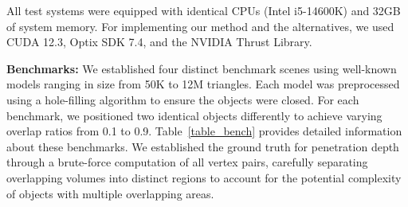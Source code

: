 All test systems were equipped with identical CPUs (Intel i5-14600K) and 32GB of system memory.
For implementing our method and the alternatives, we used CUDA 12.3, Optix SDK 7.4, and the NVIDIA Thrust Library.

\textbf{Benchmarks: }
We established four distinct benchmark scenes using well-known models ranging in size from 50K to 12M triangles.
Each model was preprocessed using a hole-filling algorithm to ensure the objects were closed.
For each benchmark, we positioned two identical objects differently to achieve varying overlap ratios from 0.1 to 0.9.
Table~\ref{table_bench} provides detailed information about these benchmarks.
We established the ground truth for penetration depth through a brute-force computation of all vertex pairs, carefully separating overlapping volumes into distinct regions to account for the potential complexity of objects with multiple overlapping areas.







